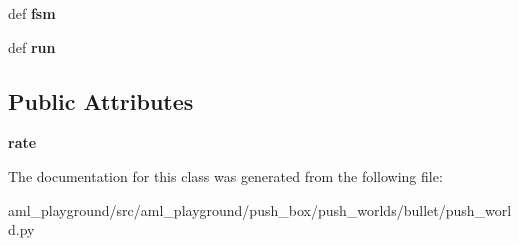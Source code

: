\begin{DoxyCompactItemize}
\item 
\hypertarget{classaml__playground_1_1push__box_1_1push__worlds_1_1bullet_1_1push__world_1_1_push_world_ad6703ec167be8ead5ecd33f532e463c4}{def {\bfseries fsm}}\label{classaml__playground_1_1push__box_1_1push__worlds_1_1bullet_1_1push__world_1_1_push_world_ad6703ec167be8ead5ecd33f532e463c4}

\item 
\hypertarget{classaml__playground_1_1push__box_1_1push__worlds_1_1bullet_1_1push__world_1_1_push_world_a3964f04a6582d0348f7790632f4225b7}{def {\bfseries run}}\label{classaml__playground_1_1push__box_1_1push__worlds_1_1bullet_1_1push__world_1_1_push_world_a3964f04a6582d0348f7790632f4225b7}

\end{DoxyCompactItemize}
\subsection*{Public Attributes}
\begin{DoxyCompactItemize}
\item 
\hypertarget{classaml__playground_1_1push__box_1_1push__worlds_1_1bullet_1_1push__world_1_1_push_world_a83238a4d02c41d646e57ab88b32f8127}{{\bfseries rate}}\label{classaml__playground_1_1push__box_1_1push__worlds_1_1bullet_1_1push__world_1_1_push_world_a83238a4d02c41d646e57ab88b32f8127}

\end{DoxyCompactItemize}


The documentation for this class was generated from the following file\-:\begin{DoxyCompactItemize}
\item 
aml\-\_\-playground/src/aml\-\_\-playground/push\-\_\-box/push\-\_\-worlds/bullet/push\-\_\-world.\-py\end{DoxyCompactItemize}
